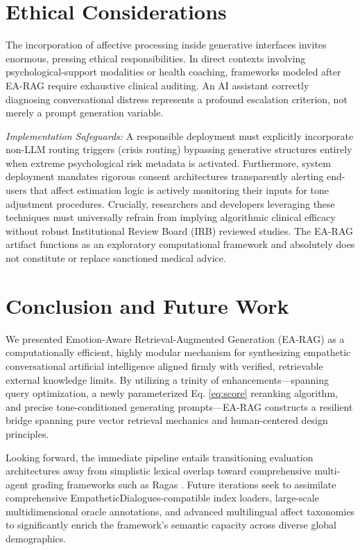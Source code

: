 \documentclass[conference]{IEEEtran}
\begin{document}
\section{Ethical Considerations}

The incorporation of affective processing inside generative interfaces invites enormous, pressing ethical responsibilities. In direct contexts involving psychological-support modalities or health coaching, frameworks modeled after EA-RAG require exhaustive clinical auditing. An AI assistant correctly diagnosing conversational distress represents a profound escalation criterion, not merely a prompt generation variable. 

\textit{Implementation Safeguards:} A responsible deployment must explicitly incorporate non-LLM routing triggers (crisis routing) bypassing generative structures entirely when extreme psychological risk metadata is activated. Furthermore, system deployment mandates rigorous consent architectures transparently alerting end-users that affect estimation logic is actively monitoring their inputs for tone adjustment procedures. Crucially, researchers and developers leveraging these techniques must universally refrain from implying algorithmic clinical efficacy without robust Institutional Review Board (IRB) reviewed studies. The EA-RAG artifact functions as an exploratory computational framework and absolutely does not constitute or replace sanctioned medical advice.

\section{Conclusion and Future Work}

We presented Emotion-Aware Retrieval-Augmented Generation (EA-RAG) as a computationally efficient, highly modular mechanism for synthesizing empathetic conversational artificial intelligence aligned firmly with verified, retrievable external knowledge limits. By utilizing a trinity of enhancements---spanning query optimization, a newly parameterized Eq. \ref{eq:score} reranking algorithm, and precise tone-conditioned generating prompts---EA-RAG constructs a resilient bridge spanning pure vector retrieval mechanics and human-centered design principles. 

Looking forward, the immediate pipeline entails transitioning evaluation architectures away from simplistic lexical overlap toward comprehensive multi-agent grading frameworks such as Ragas \cite{6}. Future iterations seek to assimilate comprehensive EmpatheticDialogues-compatible index loaders, large-scale multidimensional oracle annotations, and advanced multilingual affect taxonomies to significantly enrich the framework's semantic capacity across diverse global demographics.
\end{document}

